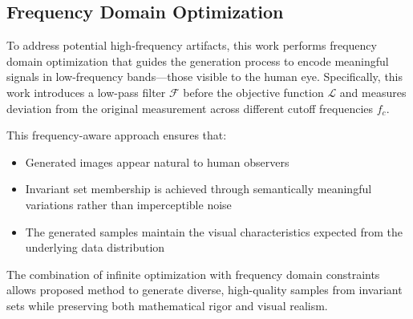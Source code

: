 \subsection{Frequency Domain Optimization}

To address potential high-frequency artifacts, this work performs frequency domain optimization that guides the generation process to encode meaningful signals in low-frequency bands---those visible to the human eye. Specifically, this work introduces a low-pass filter $\mathcal{F}$ before the objective function $\mathcal{L}$ and measures deviation from the original measurement across different cutoff frequencies $f_c$.

This frequency-aware approach ensures that:
\begin{itemize}
  \item Generated images appear natural to human observers
  \item Invariant set membership is achieved through semantically meaningful variations rather than imperceptible noise
  \item The generated samples maintain the visual characteristics expected from the underlying data distribution
\end{itemize}

The combination of infinite optimization with frequency domain constraints allows proposed method to generate diverse, high-quality samples from invariant sets while preserving both mathematical rigor and visual realism.
